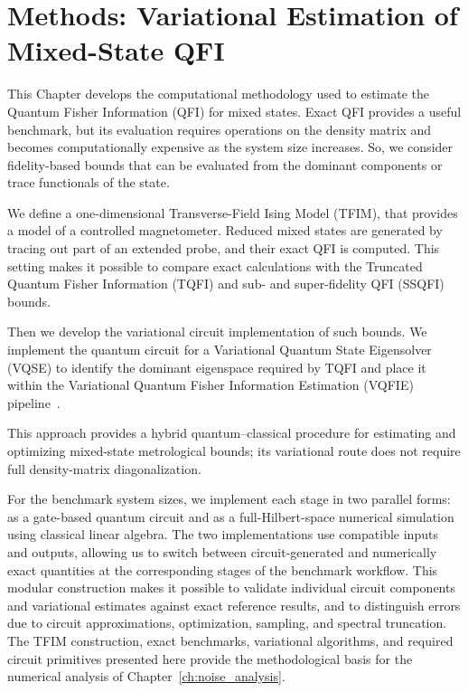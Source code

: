 \chapter{Methods: Variational Estimation of Mixed-State QFI} \label{ch:methods}

This Chapter develops the computational methodology used to estimate the Quantum Fisher Information (QFI) for mixed states. Exact QFI provides a useful benchmark, but its evaluation requires operations on the density matrix and becomes computationally expensive as the system size increases. So, we consider fidelity-based bounds that can be evaluated from the dominant components or trace functionals of the state.

We define a one-dimensional Transverse-Field Ising Model (TFIM), that provides a model of a controlled magnetometer. Reduced mixed states are generated by tracing out part of an extended probe, and their exact QFI is computed. This setting makes it possible to compare exact calculations with the Truncated Quantum Fisher Information (TQFI) and sub- and super-fidelity QFI (SSQFI) bounds.

Then we develop the variational circuit implementation of such bounds. We implement the quantum circuit for a Variational Quantum State Eigensolver (VQSE) to identify the dominant eigenspace required by TQFI and place it within the Variational Quantum Fisher Information Estimation (VQFIE) pipeline~\cite{beckey2022vqfiea,cerezo2022vqse}.

This approach provides a hybrid quantum--classical procedure for estimating and optimizing mixed-state metrological bounds; its variational route does not require full density-matrix diagonalization.

For the benchmark system sizes, we implement each stage in two parallel forms: as a gate-based quantum circuit and as a full-Hilbert-space numerical simulation using classical linear algebra. The two implementations use compatible inputs and outputs, allowing us to switch between circuit-generated and numerically exact quantities at the corresponding stages of the benchmark workflow. This modular construction makes it possible to validate individual circuit components and variational estimates against exact reference results, and to distinguish errors due to circuit approximations, optimization, sampling, and spectral truncation. The TFIM construction, exact benchmarks, variational algorithms, and required circuit primitives presented here provide the methodological basis for the numerical analysis of Chapter~\ref{ch:noise_analysis}.

